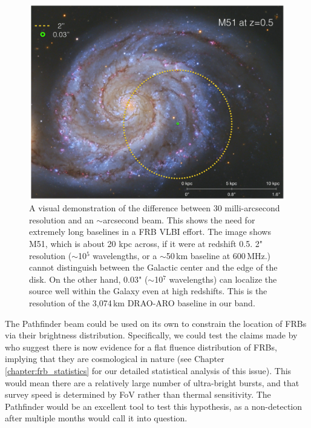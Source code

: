 \begin{figure}[!h]
\begin{center}
\includegraphics[trim={0in, 0in, 0in, 0in}, width=\textwidth]{./figures/beamforming/m51green.jpeg}
\caption[abc]{A visual demonstration of the difference between 
     30 milli-arcsecond resolution and an $\sim$arcsecond beam.
     This shows the need for extremely long baselines 
     in a FRB VLBI effort.
     The image shows M51, which is about 20 kpc across, if it
     were at redshift 0.5. 2" resolution ($\sim$10$^5$ wavelengths, or a
     $\sim$50\,km baseline at 600\,MHz.) cannot distinguish between the 
     Galactic center and the edge of the disk. On the other hand, 
     0.03" ($\sim$10$^7$ wavelengths) can localize the source well 
     within the Galaxy even at high redshifts. This is the 
     resolution of the 3,074\,km DRAO-ARO baseline in our band.}  
\label{fig-m51}
\end{center}
\end{figure}

The Pathfinder beam could be used on its own to constrain 
the location of FRBs via their brightness distribution.
Specifically, we could test the claims made by
\citet{2016arXiv160606795V} who suggest there is now evidence 
for a flat fluence distribution of FRBs, implying 
that they are cosmological in nature 
(see Chapter \ref{chapter:frb_statistics} for our detailed statistical
analysis of this issue). 
This would mean there are a relatively large number of 
ultra-bright bursts, 
and that survey speed is determined by FoV rather than 
thermal sensitivity. The Pathfinder would be an excellent 
tool to test this hypothesis, as a non-detection after multiple months 
would call it into question. 


